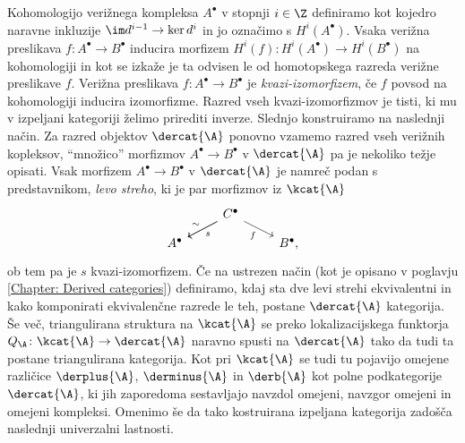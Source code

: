 Kohomologijo verižnega kompleksa $A^\bullet$ v stopnji $i \in \Z$ definiramo kot kojedro naravne inkluzije $\im d^{i-1} \to \ker d^i$ in jo označimo s $H^i(A^\bullet)$. Vsaka verižna preslikava ${f \colon A^\bullet \to B^\bullet}$ inducira morfizem $H^i(f) \colon H^i(A^\bullet) \to H^i(B^\bullet)$ na kohomologiji in kot se izkaže je ta odvisen le od homotopskega razreda verižne preslikave $f$. Verižna preslikava $f \colon A^\bullet \to B^\bullet$ je \emph{kvazi-izomorfizem}, če $f$ povsod na kohomologiji inducira izomorfizme. Razred vseh kvazi-izomorfizmov je tisti, ki mu v izpeljani kategoriji želimo prirediti inverze. Slednjo konstruiramo na naslednji način. Za razred objektov $\dercat{\A}$ ponovno vzamemo razred vseh verižnih kopleksov, ``množico'' morfizmov $A^\bullet \to B^\bullet$ v $\dercat{\A}$ pa je nekoliko težje opisati. Vsak morfizem $A^\bullet \to B^\bullet$ v $\dercat{\A}$ je namreč podan s predstavnikom, \ti \emph{levo streho}, ki je par morfizmov iz $\kcat{\A}$
\begin{equation*}
    \begin{tikzcd}[row sep = small, column sep = small]
	&& C^\bullet \\
	A^\bullet &&&& B^\bullet,
	\arrow["s", from=1-3, to=2-1]
	\arrow["\sim"', from=1-3, to=2-1]
	\arrow["f"', from=1-3, to=2-5]
    \end{tikzcd}
\end{equation*}
ob tem pa je $s$ kvazi-izomorfizem. Če na ustrezen način (kot je opisano v poglavju \ref{Chapter: Derived categories}) definiramo, kdaj sta dve levi strehi ekvivalentni in kako komponirati ekvivalenčne razrede le teh, postane $\dercat{\A}$ kategorija. Še več, triangulirana struktura na $\kcat{\A}$ se preko lokalizacijskega funktorja $Q_\A \colon \kcat{\A} \to \dercat{\A}$ naravno spusti na $\dercat{\A}$ tako da tudi ta postane triangulirana kategorija. Kot pri $\kcat{\A}$ se tudi tu pojavijo omejene različice $\derplus{\A}$, $\derminus{\A}$ in $\derb{\A}$ kot polne podkategorije $\dercat{\A}$, ki jih zaporedoma sestavljajo navzdol omejeni, navzgor omejeni in omejeni kompleksi. Omenimo še da tako kostruirana izpeljana kategorija zadošča naslednji univerzalni lastnosti. 

